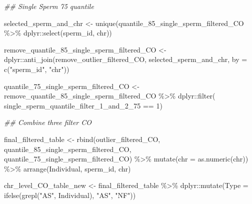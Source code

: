 \documentclass[
  letterpaper,
  DIV=11,
  numbers=noendperiod]{scrreprt}
\newenvironment{Shaded}{\begin{snugshade}}{\end{snugshade}}
\newcommand{\AttributeTok}[1]{\textcolor[rgb]{0.40,0.45,0.13}{#1}}
\newcommand{\DecValTok}[1]{\textcolor[rgb]{0.68,0.00,0.00}{#1}}
\newcommand{\DocumentationTok}[1]{\textcolor[rgb]{0.37,0.37,0.37}{\textit{#1}}}
\newcommand{\FunctionTok}[1]{\textcolor[rgb]{0.28,0.35,0.67}{#1}}
\newcommand{\NormalTok}[1]{\textcolor[rgb]{0.00,0.23,0.31}{#1}}
\newcommand{\OtherTok}[1]{\textcolor[rgb]{0.00,0.23,0.31}{#1}}
\newcommand{\SpecialCharTok}[1]{\textcolor[rgb]{0.37,0.37,0.37}{#1}}
\newcommand{\StringTok}[1]{\textcolor[rgb]{0.13,0.47,0.30}{#1}}
\begin{document}
\begin{codelisting}
\begin{Shaded}
\begin{Highlighting}[]
\DocumentationTok{\#\# Single Sperm 75 quantile }

\NormalTok{selected\_sperm\_and\_chr }\OtherTok{\textless{}{-}} \FunctionTok{unique}\NormalTok{(quantile\_85\_single\_sperm\_filtered\_CO }\SpecialCharTok{\%\textgreater{}\%}\NormalTok{ dplyr}\SpecialCharTok{::}\FunctionTok{select}\NormalTok{(sperm\_id, chr))}

\NormalTok{remove\_quantile\_85\_single\_sperm\_filtered\_CO }\OtherTok{\textless{}{-}}\NormalTok{  dplyr}\SpecialCharTok{::}\FunctionTok{anti\_join}\NormalTok{(remove\_outlier\_filtered\_CO, selected\_sperm\_and\_chr, }\AttributeTok{by =} \FunctionTok{c}\NormalTok{(}\StringTok{"sperm\_id"}\NormalTok{, }\StringTok{"chr"}\NormalTok{))}

\NormalTok{quantile\_75\_single\_sperm\_filtered\_CO }\OtherTok{\textless{}{-}}\NormalTok{ remove\_quantile\_85\_single\_sperm\_filtered\_CO }\SpecialCharTok{\%\textgreater{}\%}\NormalTok{ dplyr}\SpecialCharTok{::}\FunctionTok{filter}\NormalTok{( single\_sperm\_quantile\_filter\_1\_and\_2\_75 }\SpecialCharTok{==} \DecValTok{1}\NormalTok{)}

\DocumentationTok{\#\# Combine three filter CO}

\NormalTok{final\_filtered\_table }\OtherTok{\textless{}{-}} \FunctionTok{rbind}\NormalTok{(outlier\_filtered\_CO, quantile\_85\_single\_sperm\_filtered\_CO, quantile\_75\_single\_sperm\_filtered\_CO) }\SpecialCharTok{\%\textgreater{}\%} \FunctionTok{mutate}\NormalTok{(}\AttributeTok{chr =} \FunctionTok{as.numeric}\NormalTok{(chr)) }\SpecialCharTok{\%\textgreater{}\%} \FunctionTok{arrange}\NormalTok{(Individual, sperm\_id, chr)}

\NormalTok{chr\_level\_CO\_table\_new }\OtherTok{\textless{}{-}}\NormalTok{ final\_filtered\_table }\SpecialCharTok{\%\textgreater{}\%}\NormalTok{ dplyr}\SpecialCharTok{::}\FunctionTok{mutate}\NormalTok{(}\AttributeTok{Type =} \FunctionTok{ifelse}\NormalTok{(}\FunctionTok{grepl}\NormalTok{(}\StringTok{"AS"}\NormalTok{, Individual), }\StringTok{"AS"}\NormalTok{, }\StringTok{"NF"}\NormalTok{))}
\end{Highlighting}
\end{Shaded}

\end{codelisting}
\end{document}
